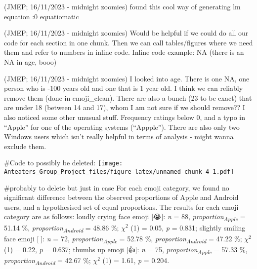 \documentclass[
]{article}
\begin{document}
(JMEP; 16/11/2023 - midnight zoomies) found this cool way of generating lm equation :0 equatiomatic

(JMEP; 16/11/2023 - midnight zoomies) Would be helpful if we could do all our code for each section in one chunk. Then we can call tables/figures where we need them and refer to numbers in inline code. Inline code example: NA (there is an NA in age, booo)

(JMEP; 16/11/2023 - midnight zoomies) I looked into age. There is one NA, one person who is -100 years old and one that is 1 year old. I think we can reliably remove them (done in emoji\_clean). There are also a bunch (23 to be exact) that are under 18 (between 14 and 17), whom I am not sure if we should remove??
I also noticed some other unusual stuff. Frequency ratings below 0, and a typo in ``Apple'' for one of the operating systems (``Appple''). There are also only two Windows users which isn't really helpful in terms of analysis - might wanna exclude them.

\#Code to possibly be deleted:
\texttt{[image: Anteaters\_Group\_Project\_files/figure-latex/unnamed-chunk-4-1.pdf]}

\#probably to delete but just in case
For each emoji category, we found no significant difference between the observed proportions of Apple and Android users, and a hypothesised set of equal proportions. The results for each emoji category are as follows: loudly crying face emoji {[}😭{]}: \emph{n} = 88, \emph{proportion\textsubscript{Apple}} = 51.14 \%, \emph{proportion\textsubscript{Android}} = 48.86 \%; \(\chi^2\) (1) = 0.05, \emph{p} = 0.831; slightly smiling face emoji {[}🙂{]}: \emph{n} = 72, \emph{proportion\textsubscript{Apple}} = 52.78 \%, \emph{proportion\textsubscript{Android}} = 47.22 \%; \(\chi^2\) (1) = 0.22, \emph{p} = 0.637; thumbs up emoji {[}👍{]}: \emph{n} = 75, \emph{proportion\textsubscript{Apple}} = 57.33 \%, \emph{proportion\textsubscript{Android}} = 42.67 \%; \(\chi^2\) (1) = 1.61, \emph{p} = 0.204.
\end{document}
